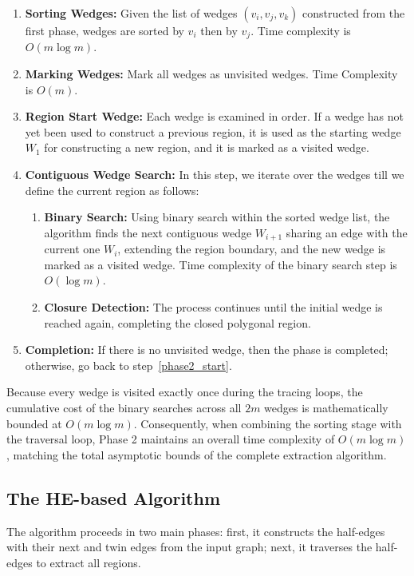 \documentclass[conference]{IEEEtran}
\begin{document}
\begin{enumerate}
    \item \textbf{Sorting Wedges:} Given the list of wedges \( (v_i, v_j, v_k) \) constructed from the first phase, wedges are sorted by \( v_i \) then by \( v_j \). Time complexity is \( O(m \log m) \).
    \item \textbf{Marking Wedges:} Mark all wedges as unvisited wedges. Time Complexity is \( O (m) \).
    \item \label{phase2_start} \textbf{Region Start Wedge:} Each wedge is examined in order. If a wedge has not yet been used to construct a previous region, it is used as the starting wedge \( W_1 \) for constructing a new region, and it is marked as a visited wedge.
    \item \textbf{Contiguous Wedge Search:} In this step, we iterate over the wedges till we define the current region as follows: 
    \begin{enumerate}
        \item \textbf{Binary Search:} Using binary search within the sorted wedge list, the algorithm finds the next contiguous wedge \( W_{i + 1}\) sharing an edge with the current one \( W_i \), extending the region boundary, and the new wedge is marked as a visited wedge. Time complexity of the binary search step is \( O (\log m) \).
        \item \textbf{Closure Detection:} The process continues until the initial wedge is reached again, completing the closed polygonal region.
    \end{enumerate}
    \item \textbf{Completion:} If there is no unvisited wedge, then the phase is completed; otherwise, go back to step~\ref{phase2_start}.
\end{enumerate}
Because every wedge is visited exactly once during the tracing loops, the cumulative cost of the binary searches across all $2m$ wedges is mathematically bounded at $O(m \log m)$. Consequently, when combining the sorting stage with the traversal loop, Phase 2 maintains an overall time complexity of $O(m \log m)$, matching the total asymptotic bounds of the complete extraction algorithm.


\subsection{The HE-based Algorithm}
The algorithm proceeds in two main phases: first, it constructs the half-edges with their next and twin edges from the input graph; next, it traverses the half-edges to extract all regions.
\end{document}

